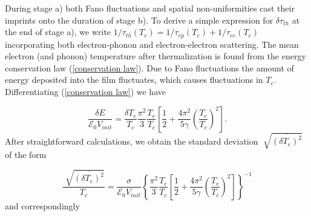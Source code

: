 \documentclass[%
reprint,
 amsmath,amssymb,
aps,
pra,
]{revtex4-1}
\begin{document}
\quad During stage a) both Fano fluctuations and spatial non-uniformities cast their imprints onto the duration of stage b). To derive a simple expression for \(\delta\tau_{th}\) at the end of stage a), we write \(1/\tau_{th}(T_e) =  1/\tau_{ep}(T_e) + 1/\tau_{ee}(T_e)\) incorporating both electron-phonon and electron-electron scattering. The mean electron (and phonon) temperature after thermalization is found from the energy conservation law (\ref{conservation law}).  Due to Fano fluctuations the amount of energy deposited into the film fluctuates, which causes fluctuations in \(T_e\).  Differentiating (\ref{conservation law}) we have 

\begin{equation}\label{differentiated conservation law}
\frac{\delta E}{\mathcal{E}_0 V_{init}} = \frac{\delta T_e}{T_c}\frac{\pi^2}{3}\frac{T_e}{T_c}\left[\frac{1}{2} + \frac{4 \pi^2}{5 \gamma}\left(\frac{T_e}{T_c}\right)^2\right].
\end{equation}
After straightforward calculations, we obtain the standard deviation \(\sqrt[]{\overline{\left(\delta T_e\right)^2}}\) of the form 

\begin{equation}\label{temperature fluctuations}
\frac{\sqrt[]{\overline{\left(\delta T_e\right)^2}}}{T_c} = \frac{\sigma}{\mathcal{E}_0 V_{init}} \left\lbrace \frac{\pi^2}{3}\frac{T_e}{T_c}\left[\frac{1}{2} + \frac{4 \pi^2}{5 \gamma}\left(\frac{T_e}{T_c}\right)^2\right]\right\rbrace^{-1}
\end{equation}
and correspondingly
\end{document}
